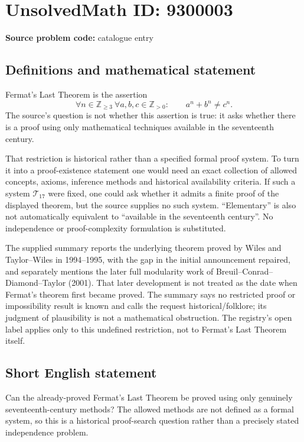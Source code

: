 \documentclass[11pt]{article}
\begin{document}
\section*{UnsolvedMath ID: 9300003}
\textbf{Source problem code:} catalogue entry
\subsection{Definitions and mathematical statement}
Fermat's Last Theorem is the assertion
\[
 \forall n\in\mathbb Z_{\ge3}\ \forall a,b,c\in\mathbb Z_{>0}:\qquad
 a^n+b^n\ne c^n.
\]
The source's question is not whether this assertion is true: it asks whether there is a proof using only mathematical techniques available in the seventeenth century.

That restriction is historical rather than a specified formal proof system. To turn it into a proof-existence statement one would need an exact collection of allowed concepts, axioms, inference methods and historical availability criteria. If such a system \(\mathcal T_{17}\) were fixed, one could ask whether it admits a finite proof of the displayed theorem, but the source supplies no such system. ``Elementary'' is also not automatically equivalent to ``available in the seventeenth century''. No independence or proof-complexity formulation is substituted.

The supplied summary reports the underlying theorem proved by Wiles and Taylor--Wiles in 1994--1995, with the gap in the initial announcement repaired, and separately mentions the later full modularity work of Breuil--Conrad--Diamond--Taylor (2001). That later development is not treated as the date when Fermat's theorem first became proved. The summary says no restricted proof or impossibility result is known and calls the request historical/folklore; its judgment of plausibility is not a mathematical obstruction. The registry's open label applies only to this undefined restriction, not to Fermat's Last Theorem itself.
\subsection{Short English statement}
Can the already-proved Fermat's Last Theorem be proved using only genuinely seventeenth-century methods? The allowed methods are not defined as a formal system, so this is a historical proof-search question rather than a precisely stated independence problem.
\end{document}
